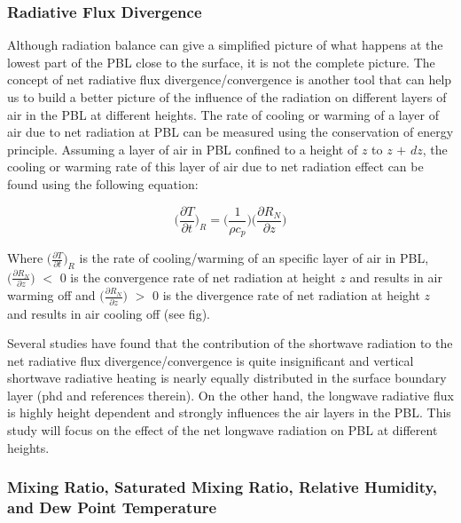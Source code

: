\documentclass[a4paper,12pt]{article}
\numberwithin{equation}{section} %
\begin{document}
\subsubsection{Radiative Flux Divergence}

Although radiation balance can give a simplified picture of what happens at the lowest part of the PBL close to the surface, it is not the complete picture. The concept of net radiative flux divergence/convergence is another tool that can help us to build a better picture of the influence of the radiation on different layers of air in the PBL at different heights. The rate of cooling or warming of a layer of air due to net radiation at PBL can be measured using the conservation of energy principle. Assuming a layer of air in PBL confined to a height of $z$ to $z$ $+$ $dz$, the cooling or warming rate of this layer of air due to net radiation effect can be found using the following equation: 

\vspace{0.25cm}
\begin{equation}
\Big(\frac{\partial T}{\partial t}\Big)_R = \Big(\frac{1}{\rho c_p}\Big)\Big(\frac{\partial R_N}{\partial z}\Big)
\end{equation}
\vspace{0.25cm}

Where $\Big(\frac{\partial T}{\partial t}\Big)_R$ is the rate of cooling/warming of an specific layer of air in PBL, $\Big(\frac{\partial R_N}{\partial z}\Big)$ $<$ 0 is the convergence rate of net radiation at height $z$ and results in air warming off and $\Big(\frac{\partial R_N}{\partial z}\Big)$ $>$ 0 is the divergence rate of net radiation at height $z$ and results in air cooling off (see fig).

Several studies have found that the contribution of the shortwave radiation to the net radiative flux divergence/convergence is quite insignificant and vertical shortwave radiative heating is nearly equally distributed in the surface boundary layer (phd and references therein). On the other hand, the longwave radiative flux is highly height dependent and strongly influences the air layers in the PBL. This study will focus on the effect of the net longwave radiation on PBL at different heights.

\subsubsection{Mixing Ratio, Saturated Mixing Ratio, Relative Humidity, and Dew Point Temperature}
\end{document}
